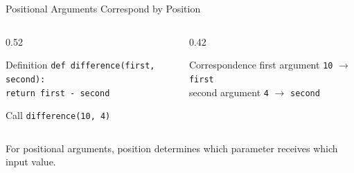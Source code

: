\documentclass[aspectratio=169,10pt]{beamer}
\begin{document}
\begin{frame}{Positional Arguments Correspond by Position}
  \begin{columns}[T,onlytextwidth]
    \begin{column}{0.52\textwidth}
      \begin{block}{Definition}
        \texttt{def difference(first, second):}\\
        \hspace*{1em}\texttt{return first - second}
      \end{block}

      \begin{block}{Call}
        \texttt{difference(10, 4)}
      \end{block}
    \end{column}

    \begin{column}{0.42\textwidth}
      \begin{block}{Correspondence}
        first argument \texttt{10} $\rightarrow$ \texttt{first}\\[0.10in]
        second argument \texttt{4} $\rightarrow$ \texttt{second}
      \end{block}
    \end{column}
  \end{columns}

  \begin{keyidea}
    For positional arguments, position determines which parameter receives which input value.
  \end{keyidea}
\end{frame}
\end{document}
